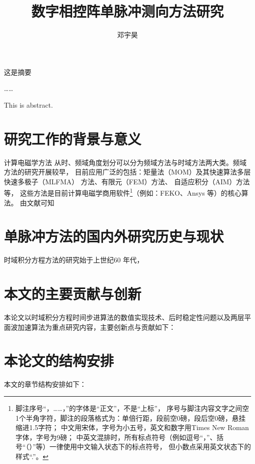 \documentclass[master]{thesis-uestc}
\title{数字相控阵单脉冲测向方法研究}{The Research on Monopulse estimation with 
Digital Phased Array}
\author{邓宇昊}{Yuhao Deng}
\begin{document}
\makecover

\begin{chineseabstract}
这是摘要

……

\end{chineseabstract}

\begin{englishabstract}
This is abstract.

\end{englishabstract}

\thesistableofcontents

\thesischapterexordium

\section{研究工作的背景与意义}
计算电磁学方法
从时、频域角度划分可以分为频域方法与时域方法两大类。频域方法的研究开展较早，
目前应用广泛的包括：矩量法（MOM）及其快速算法多层快速多极子（MLFMA）
方法、有限元（FEM）方法、
自适应积分（AIM）方法等，
这些方法是目前计算电磁学商用软件\footnote{脚注序号“，……，”的字体是“正文”，不是“上标”，
序号与脚注内容文字之间空1个半角字符，脚注的段落格式为：单倍行距，段前空0磅，段后空0磅，悬挂缩进1.5字符；
中文用宋体，字号为小五号，英文和数字用Times New Roman字体，字号为9磅；
中英文混排时，所有标点符号（例如逗号“，”、括号“（）”等）一律使用中文输入状态下的标点符号，
但小数点采用英文状态下的样式“.”。}（例如：FEKO、Ansys 等）的核心算法。
由文献\cite{feng997he,clerc2010discrete,xiao2012yi}可知

\section{单脉冲方法的国内外研究历史与现状}
时域积分方程方法的研究始于上世纪60 年代，

\section{本文的主要贡献与创新}
本论文以时域积分方程时间步进算法的数值实现技术、后时稳定性问题以及两层平面波加速算法为重点研究内容，主要创新点与贡献如下：

\section{本论文的结构安排}
本文的章节结构安排如下：
\end{document}
